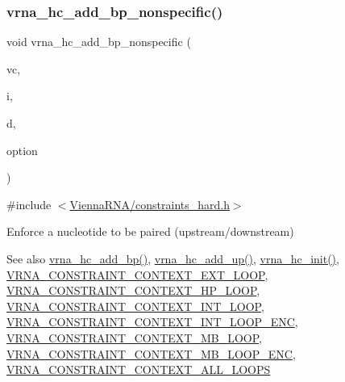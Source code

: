 \subsubsection{\texorpdfstring{vrna\+\_\+hc\+\_\+add\+\_\+bp\+\_\+nonspecific()}{vrna\_hc\_add\_bp\_nonspecific()}}
{\footnotesize\ttfamily void vrna\+\_\+hc\+\_\+add\+\_\+bp\+\_\+nonspecific (\begin{DoxyParamCaption}\item[{\mbox{\hyperlink{group__fold__compound_ga1b0cef17fd40466cef5968eaeeff6166}{vrna\+\_\+fold\+\_\+compound\+\_\+t}} $\ast$}]{vc,  }\item[{int}]{i,  }\item[{int}]{d,  }\item[{unsigned char}]{option }\end{DoxyParamCaption})}



{\ttfamily \#include $<$\mbox{\hyperlink{constraints__hard_8h}{Vienna\+R\+N\+A/constraints\+\_\+hard.\+h}}$>$}



Enforce a nucleotide to be paired (upstream/downstream) 

\begin{DoxySeeAlso}{See also}
\mbox{\hyperlink{group__hard__constraints_ga7cba95ebe2ceb5ec9a5768f2232854fd}{vrna\+\_\+hc\+\_\+add\+\_\+bp()}}, \mbox{\hyperlink{group__hard__constraints_ga447d88e06ad97bb225cd83310ace8345}{vrna\+\_\+hc\+\_\+add\+\_\+up()}}, \mbox{\hyperlink{group__hard__constraints_ga36ff456c43bf920629cee5a236e4f0ff}{vrna\+\_\+hc\+\_\+init()}}, \mbox{\hyperlink{group__hard__constraints_ga9418eda62a5dec070896702c279d2548}{V\+R\+N\+A\+\_\+\+C\+O\+N\+S\+T\+R\+A\+I\+N\+T\+\_\+\+C\+O\+N\+T\+E\+X\+T\+\_\+\+E\+X\+T\+\_\+\+L\+O\+OP}}, \mbox{\hyperlink{group__hard__constraints_ga79203702b197b6b9d3b78eed40663eb1}{V\+R\+N\+A\+\_\+\+C\+O\+N\+S\+T\+R\+A\+I\+N\+T\+\_\+\+C\+O\+N\+T\+E\+X\+T\+\_\+\+H\+P\+\_\+\+L\+O\+OP}}, \mbox{\hyperlink{group__hard__constraints_ga21feeab3a9e5fa5a9e3d9ac0fcf5994f}{V\+R\+N\+A\+\_\+\+C\+O\+N\+S\+T\+R\+A\+I\+N\+T\+\_\+\+C\+O\+N\+T\+E\+X\+T\+\_\+\+I\+N\+T\+\_\+\+L\+O\+OP}}, \mbox{\hyperlink{group__hard__constraints_ga0536288e04ff6332ecdc23ca4705402b}{V\+R\+N\+A\+\_\+\+C\+O\+N\+S\+T\+R\+A\+I\+N\+T\+\_\+\+C\+O\+N\+T\+E\+X\+T\+\_\+\+I\+N\+T\+\_\+\+L\+O\+O\+P\+\_\+\+E\+NC}}, \mbox{\hyperlink{group__hard__constraints_ga456ecd2ff00056bb64da8dd4f61bbfc5}{V\+R\+N\+A\+\_\+\+C\+O\+N\+S\+T\+R\+A\+I\+N\+T\+\_\+\+C\+O\+N\+T\+E\+X\+T\+\_\+\+M\+B\+\_\+\+L\+O\+OP}}, \mbox{\hyperlink{group__hard__constraints_ga02a3d703ddbcfce393e4bbfcb9db7077}{V\+R\+N\+A\+\_\+\+C\+O\+N\+S\+T\+R\+A\+I\+N\+T\+\_\+\+C\+O\+N\+T\+E\+X\+T\+\_\+\+M\+B\+\_\+\+L\+O\+O\+P\+\_\+\+E\+NC}}, \mbox{\hyperlink{group__hard__constraints_ga886d9127c49bb982a4b67cd7581e8a5a}{V\+R\+N\+A\+\_\+\+C\+O\+N\+S\+T\+R\+A\+I\+N\+T\+\_\+\+C\+O\+N\+T\+E\+X\+T\+\_\+\+A\+L\+L\+\_\+\+L\+O\+O\+PS}}
\end{DoxySeeAlso}

